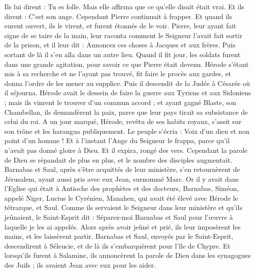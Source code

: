 \begin{multicols}{2}
Ils lui dirent : Tu es folle. Mais elle affirma que ce qu'elle disait était vrai.
Et ils dirent : C'est son ange. Cependant Pierre continuait à frapper. Et quand ils eurent ouvert, ils le virent, et furent étonnés de le voir.
Pierre, leur ayant fait signe de se taire de la main, leur raconta comment le Seigneur l'avait fait sortir de la prison, et il leur dit : Annoncez ces choses à Jacques et aux frères. Puis sortant de là il s'en alla dans un autre lieu.
Quand il fit jour, les soldats furent dans une grande agitation, pour savoir ce que Pierre était devenu.
Hérode s'étant mis à sa recherche et ne l'ayant pas trouvé, fit faire le procès aux gardes, et donna l'ordre de les mener au supplice. Puis il descendit de la Judée à Césarée où il séjourna.
Hérode avait le dessein de faire la guerre aux Tyriens et aux Sidoniens ; mais ils vinrent le trouver d'un commun accord ; et ayant gagné Blaste, son Chambellan, ils demandèrent la paix, parce que leur pays tirait sa subsistance de celui du roi.
A un jour marqué, Hérode, revêtu de ses habits royaux, s'assit sur son trône et les harangua publiquement.
Le peuple s'écria : Voix d'un dieu et non point d'un homme !
Et à l'instant l'Ange du Seigneur le frappa, parce qu'il n'avait pas donné gloire à Dieu. Et il expira, rongé des vers.
Cependant la parole de Dieu se répandait de plus en plus, et le nombre des disciples augmentait.
Barnabas et Saul, après s'être acquittés de leur ministère, s'en retournèrent de Jérusalem, ayant aussi pris avec eux Jean, surnommé Marc.
\VerseOne{}Or il y avait dans l'Eglise qui était à Antioche des prophètes et des docteurs, Barnabas, Siméon, appelé Niger, Lucius le Cyrénien, Manahen, qui avait été élevé avec Hérode le tétrarque, et Saul.
Comme ils servaient le Seigneur dans leur ministère et qu'ils jeûnaient, le Saint-Esprit dit : Séparez-moi Barnabas et Saul pour l'œuvre à laquelle je les ai appelés.
Alors après avoir jeûné et prié, ils leur imposèrent les mains, et les laissèrent partir.
Barnabas et Saul, envoyés par le Saint-Esprit, descendirent à Séleucie, et de là ils s'embarquèrent pour l'île de Chypre.
Et lorsqu'ils furent à Salamine, ils annoncèrent la parole de Dieu dans les synagogues des Juifs ; ils avaient Jean avec eux pour les aider.

\end{multicols}
